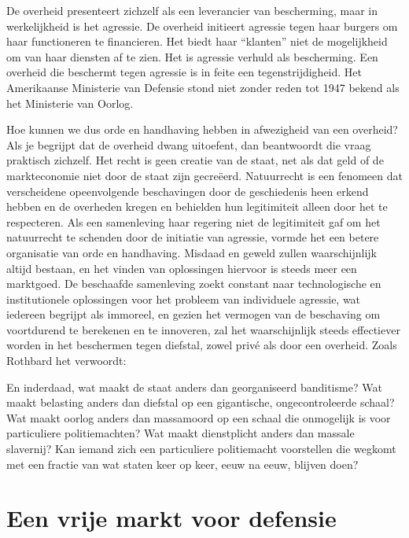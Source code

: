 De overheid presenteert zichzelf als een leverancier van bescherming, maar in werkelijkheid is het agressie. De overheid initieert agressie tegen haar burgers om haar functioneren te financieren. Het biedt haar ``klanten'' niet de mogelijkheid om van haar diensten af te zien. Het is agressie verhuld als bescherming. Een overheid die beschermt tegen agressie is in feite een tegenstrijdigheid. Het Amerikaanse Ministerie van Defensie stond niet zonder reden tot 1947 bekend als het Ministerie van Oorlog.

Hoe kunnen we dus orde en handhaving hebben in afwezigheid van een overheid? Als je begrijpt dat de overheid dwang uitoefent, dan beantwoordt die vraag praktisch zichzelf. Het recht is geen creatie van de staat, net als dat geld of de markteconomie niet door de staat zijn gecreëerd. Natuurrecht is een fenomeen dat verscheidene opeenvolgende beschavingen door de geschiedenis heen erkend hebben en de overheden kregen en behielden hun legitimiteit alleen door het te respecteren. Als een samenleving haar regering niet de legitimiteit gaf om het natuurrecht te schenden door de initiatie van agressie, vormde het een betere organisatie van orde en handhaving. Misdaad en geweld zullen waarschijnlijk altijd bestaan, en het vinden van oplossingen hiervoor is steeds meer een marktgoed. De beschaafde samenleving zoekt constant naar technologische en institutionele oplossingen voor het probleem van individuele agressie, wat iedereen begrijpt als immoreel, en gezien het vermogen van de beschaving om voortdurend te berekenen en te innoveren, zal het waarschijnlijk steeds effectiever worden in het beschermen tegen diefstal, zowel privé als door een overheid. Zoals Rothbard het verwoordt:

\begin{blockquotebox}
En inderdaad, wat maakt de staat anders dan georganiseerd banditisme? Wat maakt belasting anders dan diefstal op een gigantische, ongecontroleerde schaal? Wat maakt oorlog anders dan massamoord op een schaal die onmogelijk is voor particuliere politiemachten? Wat maakt dienstplicht anders dan massale slavernij? Kan iemand zich een particuliere politiemacht voorstellen die wegkomt met een fractie van wat staten keer op keer, eeuw na eeuw, blijven doen?\footnotemark
\end{blockquotebox}

\hypertarget{een-vrije-markt-voor-bescherming}{%
\section{Een vrije markt voor defensie}\label{een-vrije-markt-voor-bescherming}}

